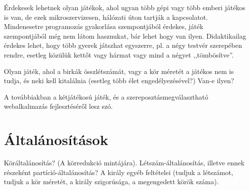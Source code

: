\documentclass{article}
\begin{document}
	Érdekesek lehetnek olyan játékok, ahol ugyan több gépi vagy több emberi játékos is van, de ezek mikroszervizesen, hálózati úton tartják a kapcsolatot. Mindenesetre programozás gyakorlása szempontjából érdekes, játék szempontjából még nem látom hasznukat, bár lehet hogy van ilyen. Didaktikailag érdekes lehet, hogy több gyerek játszhat egyszerre, pl. a négy testvér szerepében rendre, esetleg közülük kettőt vagy hármat vagy mind a négyet ,,tömbösítve''.

	Olyan játék, ahol a birkák összlétszámát, vagy a kör méretét a játékos nem is tudja, és neki kell kitalálnia (esetleg több élet engedélyezésével?) Van-e ilyen?

	A továbbiakban a kétjátékosú játék, és a szereposztásmegválasztható webalkalmazás fejlesztéséről lesz szó.

	\section{Általánosítások}

	Köráltalánosítás? (A körredukció mintájára). Létszám-általánosítás, illetve ennek részeként partíció-általánosítás? A király egyéb feltételei (tudjuk a létszámot, tudjuk a kör méretét, a király szigorúsága, a megengedett körök száma).
\end{document}
